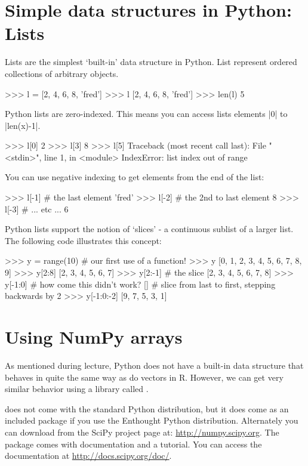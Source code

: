 \section{Simple data structures in Python: Lists}

Lists are the simplest `built-in' data structure in Python. List
represent ordered collections of arbitrary objects.
%
\begin{python}
>>> l = [2, 4, 6, 8, 'fred']
>>> l
[2, 4, 6, 8, 'fred']
>>> len(l)
5
\end{python}

Python lists are zero-indexed. This means you can access lists elements
|0| to |len(x)-1|.
%
\begin{python}
>>> l[0]
2
>>> l[3]
8
>>> l[5]
Traceback (most recent call last):
  File "<stdin>", line 1, in <module>
IndexError: list index out of range
\end{python}
%
You can use negative indexing to get elements from the end of the list:
\begin{python}
>>> l[-1] # the last element
'fred'
>>> l[-2] # the 2nd to last element
8
>>> l[-3] # ... etc ...
6
\end{python}

Python lists support the notion of `slices' - a continuous sublist of a
larger list. The following code illustrates this concept:
%
\begin{python}
>>> y = range(10)  # our first use of a function!
>>> y
[0, 1, 2, 3, 4, 5, 6, 7, 8, 9]
>>> y[2:8]
[2, 3, 4, 5, 6, 7]
>>> y[2:-1] # the slice
[2, 3, 4, 5, 6, 7, 8]
>>> y[-1:0] # how come this didn't work? 
[]
# slice from last to first, stepping backwards by 2
>>> y[-1:0:-2]  
[9, 7, 5, 3, 1]
\end{python}

\section{Using NumPy arrays}

As mentioned during lecture, Python does not have a built-in data
structure that behaves in quite the same way as do vectors in R.
However, we can get very similar behavior using a library called \numpy.

\numpy does not come with the standard Python distribution, but it does come
as an included package if you use the Enthought Python distribution.
Alternately you can download \numpy from the SciPy project page at:
\url{http://numpy.scipy.org}. The \numpy package comes with documentation and
a tutorial. You can access the documentation at
\url{http://docs.scipy.org/doc/}.

